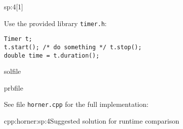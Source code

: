 \begin{samproblem}
\begin{subproblem}{sp:4}[1]
  \begin{samhint}
    Use the provided library \texttt{timer.h}:
    \begin{lstlisting}[style=cpp]
Timer t;
t.start(); /* do something */ t.stop();
double time = t.duration();
    \end{lstlisting}
  \end{samhint}


  \begin{samwriteprbpart}{solfile}
    \begin{writeverbatim}{prbfile}
      \begin{samsolution}
        See file \texttt{horner.cpp} for the full implementation:
        \begin{samcode}[C++-code]{cpp:horner:sp:4}{Suggested solution for runtime comparison}
        \end{samcode}
     \end{samsolution}
    \end{writeverbatim}
  \end{samwriteprbpart}

\end{subproblem}

\end{samproblem}

